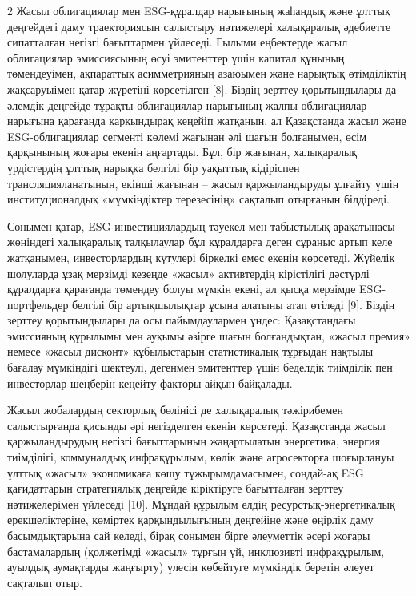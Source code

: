\begin{multicols}{2}
Жасыл облигациялар мен ESG-құралдар нарығының жаһандық және ұлттық
деңгейдегі даму траекториясын салыстыру нәтижелері халықаралық әдебиетте
сипатталған негізгі бағыттармен үйлеседі. Ғылыми еңбектерде жасыл
облигациялар эмиссиясының өсуі эмитенттер үшін капитал құнының
төмендеуімен, ақпараттық асимметрияның азаюымен және нарықтық
өтімділіктің жақсаруыімен қатар жүретіні көрсетілген {[}8{]}. Біздің
зерттеу қорытындылары да әлемдік деңгейде тұрақты облигациялар нарығының
жалпы облигациялар нарығына қарағанда қарқындырақ кеңейіп жатқанын, ал
Қазақстанда жасыл және ESG-облигациялар сегменті көлемі жағынан әлі
шағын болғанымен, өсім қарқынының жоғары екенін аңғартады. Бұл, бір
жағынан, халықаралық үрдістердің ұлттық нарыққа белгілі бір уақыттық
кідіріспен трансляцияланатынын, екінші жағынан -- жасыл қаржыландыруды
ұлғайту үшін институционалдық «мүмкіндіктер терезесінің» сақталып
отырғанын білдіреді.

Сонымен қатар, ESG-инвестициялардың тәуекел мен табыстылық арақатынасы
жөніндегі халықаралық талқылаулар бұл құралдарға деген сұраныс артып
келе жатқанымен, инвесторлардың күтулері біркелкі емес екенін көрсетеді.
Жүйелік шолуларда ұзақ мерзімді кезеңде «жасыл» активтердің кірістілігі
дәстүрлі құралдарға қарағанда төмендеу болуы мүмкін екені, ал қысқа
мерзімде ESG-портфельдер белгілі бір артықшылықтар ұсына алатыны атап
өтіледі {[}9{]}. Біздің зерттеу қорытындылары да осы пайымдаулармен
үндес: Қазақстандағы эмиссияның құрылымы мен ауқымы әзірге шағын
болғандықтан, «жасыл премия» немесе «жасыл дисконт» құбылыстарын
статистикалық тұрғыдан нақтылы бағалау мүмкіндігі шектеулі, дегенмен
эмитенттер үшін беделдік тиімділік пен инвесторлар шеңберін кеңейту
факторы айқын байқалады.

Жасыл жобалардың секторлық бөлінісі де халықаралық тәжірибемен
салыстырғанда қисынды әрі негізделген екенін көрсетеді. Қазақстанда
жасыл қаржыландырудың негізгі бағыттарының жаңартылатын энергетика,
энергия тиімділігі, коммуналдық инфрақұрылым, көлік және агросекторға
шоғырлануы ұлттық «жасыл» экономикаға көшу тұжырымдамасымен, сондай-ақ
ESG қағидаттарын стратегиялық деңгейде кіріктіруге бағытталған зерттеу
нәтижелерімен үйлеседі {[}10{]}. Мұндай құрылым елдің
ресурстық-энергетикалық ерекшеліктеріне, көміртек қарқындылығының
деңгейіне және өңірлік даму басымдықтарына сай келеді, бірақ сонымен
бірге әлеуметтік әсері жоғары бастамалардың (қолжетімді «жасыл» тұрғын
үй, инклюзивті инфрақұрылым, ауылдық аумақтарды жаңғырту) үлесін
көбейтуге мүмкіндік беретін әлеует сақталып отыр.


\end{multicols}
